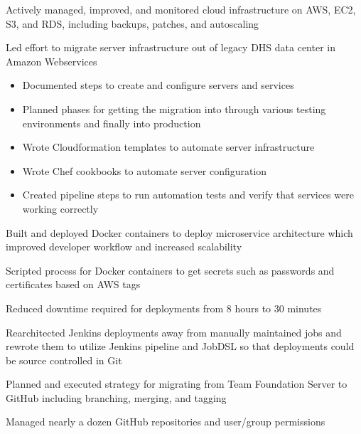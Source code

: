\begin{cventries}
{\begin{cvitems}
        \item {Actively managed, improved, and monitored cloud infrastructure on AWS, EC2, S3, and RDS, including backups, patches, and autoscaling}
        \item {Led effort to migrate server infrastructure out of legacy DHS data center in Amazon Webservices}
        \begin{itemize}
          \item {Documented steps to create and configure servers and services}
          \item {Planned phases for getting the migration into through various testing environments and finally into production}
          \item {Wrote Cloudformation templates to automate server infrastructure}
          \item {Wrote Chef cookbooks to automate server configuration}
          \item {Created pipeline steps to run automation tests and verify that services were working correctly}
        \end{itemize}
        \item {Built and deployed Docker containers to deploy microservice architecture which improved developer workflow and increased scalability}
        \item {Scripted process for Docker containers to get secrets such as passwords and certificates based on AWS tags}
        \item {Reduced downtime required for deployments from 8 hours to 30 minutes}
        \item {Rearchitected Jenkins deployments away from manually maintained jobs and rewrote them to utilize Jenkins pipeline and JobDSL so that deployments could be source controlled in Git}
        \item {Planned and executed strategy for migrating from Team Foundation Server to GitHub including branching, merging, and tagging}
        \item {Managed nearly a dozen GitHub repositories and user/group permissions}
      \end{cvitems}
    }


\end{cventries}
